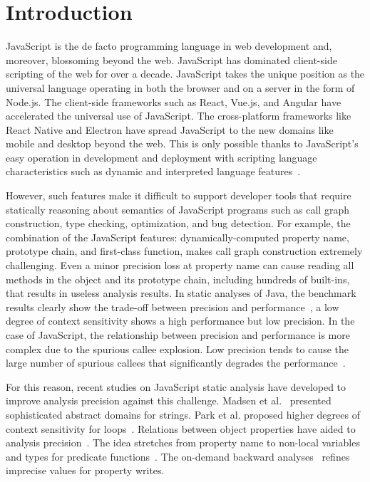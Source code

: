 \section{Introduction}\label{sec:intro}
JavaScript is the de facto programming language in web development and,
moreover, blossoming beyond the web.
JavaScript has dominated client-side scripting of the web for over a decade.
JavaScript takes the unique position as the universal language operating in both
the browser and on a server in the form of Node.js.
The client-side frameworks such as React, Vue.js, and Angular have accelerated
the universal use of JavaScript.
The cross-platform frameworks like React Native and Electron have spread
JavaScript to the new domains like mobile and desktop beyond the web.
This is only possible thanks to JavaScript's easy operation in development and
deployment with scripting language characteristics such as dynamic and
interpreted language features~\cite{weaklySPE}.


However, such features make it difficult to support developer tools that require
statically reasoning about semantics of JavaScript programs such as call graph
construction, type checking, optimization, and bug detection.
For example, the combination of the JavaScript features: dynamically-computed
property name, prototype chain, and first-class function, makes call graph
construction extremely challenging.
Even a minor precision loss at property name can cause reading all methods in
the object and its prototype chain, including hundreds of built-ins, that
results in useless analysis results.
In static analyses of Java, the benchmark results clearly show the trade-off
between precision and performance~\cite{introspective, data-driven}, a low
degree of context sensitivity shows a high performance but low precision.
In the case of JavaScript, the relationship between precision and performance is
more complex due to the spurious callee explosion.
Low precision tends to cause the large number of spurious callees that
significantly degrades the performance~\cite{correlation, determinacy-jQuery, weaklySPE, value-refinement}.


For this reason, recent studies on JavaScript static analysis have developed
to improve analysis precision against this challenge.
Madsen et al.~\cite{string, regex, combining-string} presented sophisticated
abstract domains for strings.
Park et al. proposed higher degrees of context sensitivity for loops~\cite{lsaECOOP, lsaSPE}.
Relations between object properties have aided to analysis precision~\cite{correlation, weaklyAPLAS, weaklySPE}.
The idea stretches from property name to non-local variables and types for
predicate functions~\cite{value-partitioning}.
The on-demand backward analyses~\cite{value-refinement} refines imprecise values
for property writes.



